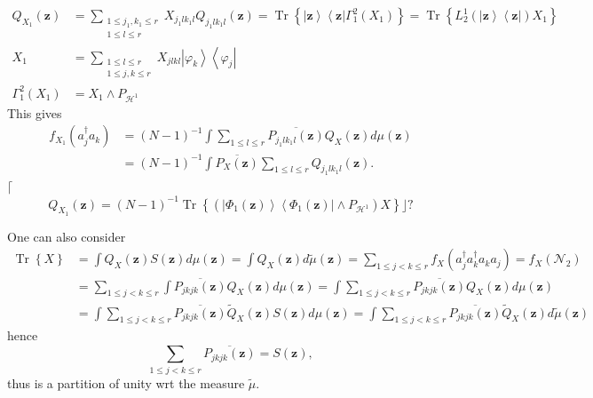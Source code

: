 \documentclass[aps,preprint]{revtex4}%
\begin{document}
\begin{align}
Q_{X_{1}}\left(  \mathbf{z}\right)   &  =\sum_{\substack{1\leq j_{1},k_{1}\leq
r\\1\leq l\leq r}}X_{j_{1}lk_{1}l}Q_{j_{1}lk_{1}l}\left(  \mathbf{z}\right)
=\operatorname*{Tr}\left\{  \left\vert \mathbf{z}\right\rangle \left\langle
\mathbf{z}\right\vert \Gamma_{1}^{2}\left(  X_{1}\right)  \right\}
=\operatorname*{Tr}\left\{  L_{2}^{1}\left(  \left\vert \mathbf{z}%
\right\rangle \left\langle \mathbf{z}\right\vert \right)  X_{1}\right\} \\
X_{1}  &  =\sum_{\substack{1\leq l\leq r\\1\leq j,k\leq r}}X_{jlkl}\left\vert
\varphi_{k}\right\rangle \left\langle \varphi_{j}\right\vert \\
\Gamma_{1}^{2}\left(  X_{1}\right)   &  =X_{1}\wedge P_{\mathcal{H}^{1}}%
\end{align}
This gives
\begin{align}
f_{X_{1}}\left(  a_{j}^{\dagger}a_{k}\right)   &  =\left(  N-1\right)
^{-1}\int\sum_{1\leq l\leq r}\overline{P_{j_{1}lk_{1}l}\left(  \mathbf{z}%
\right)  }Q_{X}\left(  \mathbf{z}\right)  d\mu\left(  \mathbf{z}\right) \\
&  =\left(  N-1\right)  ^{-1}\int\overline{P_{X}\left(  \mathbf{z}\right)
}\sum_{1\leq l\leq r}Q_{j_{1}lk_{1}l}\left(  \mathbf{z}\right)  .
\end{align}
$\lceil$%
\begin{equation}
Q_{X_{1}}\left(  \mathbf{z}\right)  =\left(  N-1\right)  ^{-1}%
\operatorname*{Tr}\left\{  \left(  \left\vert \Phi_{1}\left(  \mathbf{z}%
\right)  \right\rangle \left\langle \Phi_{1}\left(  \mathbf{z}\right)
\right\vert \wedge P_{\mathcal{H}^{1}}\right)  X\right\}  \rfloor?
\end{equation}


One can also consider
\begin{align}
\operatorname*{Tr}\left\{  X\right\}   &  =\int Q_{X}\left(  \mathbf{z}%
\right)  S\left(  \mathbf{z}\right)  d\mu\left(  \mathbf{z}\right)  =\int
Q_{X}\left(  \mathbf{z}\right)  d\tilde{\mu}\left(  \mathbf{z}\right)
=\sum_{1\leq j<k\leq r}f_{X}\left(  a_{j}^{\dagger}a_{k}^{\dagger}a_{k}%
a_{j}\right)  =f_{X}\left(  \mathcal{N}_{2}\right) \nonumber\\
&  =\sum_{1\leq j<k\leq r}\int\overline{P_{jkjk}\left(  \mathbf{z}\right)
}Q_{X}\left(  \mathbf{z}\right)  d\mu\left(  \mathbf{z}\right)  =\int%
\sum_{1\leq j<k\leq r}\overline{P_{jkjk}\left(  \mathbf{z}\right)  }%
Q_{X}\left(  \mathbf{z}\right)  d\mu\left(  \mathbf{z}\right) \nonumber\\
&  =\int\sum_{1\leq j<k\leq r}\overline{P_{jkjk}\left(  \mathbf{z}\right)
}\tilde{Q}_{X}\left(  \mathbf{z}\right)  S\left(  \mathbf{z}\right)
d\mu\left(  \mathbf{z}\right)  =\int\sum_{1\leq j<k\leq r}\overline
{P_{jkjk}\left(  \mathbf{z}\right)  }\tilde{Q}_{X}\left(  \mathbf{z}\right)
d\tilde{\mu}\left(  \mathbf{z}\right)
\end{align}
hence%
\begin{equation}
\sum_{1\leq j<k\leq r}\overline{P_{jkjk}\left(  \mathbf{z}\right)  }=S\left(
\mathbf{z}\right)  ,
\end{equation}
thus is a partition of unity wrt the measure $\tilde{\mu}$.
\end{document}
